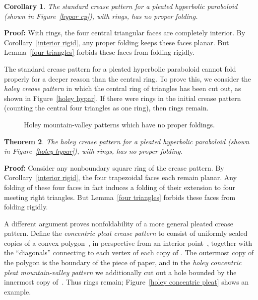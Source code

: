\documentclass[11pt,letterpaper]{article}
\newtheorem{theorem}{Theorem}
\newtheorem{corollary}[theorem]{Corollary}
\newenvironment{proof}{\noindent\textbf{Proof: }\ignorespaces}
  {\hspace*{\fill}\medskip}
\newcommand\term[1]{\emph{#1}}
\begin{document}
\begin{corollary} \label{hypar center}
  The standard crease pattern for a pleated hyperbolic paraboloid
  (shown in Figure~\ref{hypar cp}), with  rings,
  has no proper folding.
\end{corollary}

\begin{proof}
  With  rings, the four central triangular faces are completely
  interior.  By Corollary~\ref{interior rigid}, any proper folding
  keeps these faces planar.  But Lemma~\ref{four triangles} forbids
  these faces from folding rigidly.
\end{proof}

The standard crease pattern for a pleated hyperbolic paraboloid
cannot fold properly for a deeper reason than the central ring.
To prove this, we consider the \term{holey crease pattern}
in which the central ring of triangles has been cut out,
as shown in Figure~\ref{holey hypar}.
If there were  rings in the initial crease pattern
(counting the central four triangles as one ring), then  rings remain.

\begin{figure}
  \centering
  \hfil\hfil
  \caption{Holey mountain-valley patterns which have no proper foldings.}
  \label{holey}
\end{figure}

\begin{theorem}
  The holey crease pattern for a pleated hyperbolic paraboloid
  (shown in Figure~\ref{holey hypar}), with  rings,
  has no proper folding.
\end{theorem}

\begin{proof}
  Consider any nonboundary square ring of the crease pattern.
  By Corollary~\ref{interior rigid}, the four trapezoidal faces
  each remain planar.  Any folding of these four faces in fact
  induces a folding of their extension to four meeting right triangles.
  But Lemma~\ref{four triangles} forbids these faces from folding rigidly.
\end{proof}

A different argument proves nonfoldability of a more general
pleated crease pattern.  
Define the \term{concentric pleat crease pattern}
to consist of  uniformly scaled copies of a convex polygon~,
in perspective from an interior point~, together with the ``diagonals''
connecting  to each vertex of each copy of .
The outermost copy of the polygon  is the boundary of the piece of paper,
and in the \term{holey concentric pleat mountain-valley pattern}
we additionally cut out a hole bounded by the innermost copy of~.
Thus  rings remain;
Figure~\ref{holey concentric pleat} shows an example.
\end{document}
